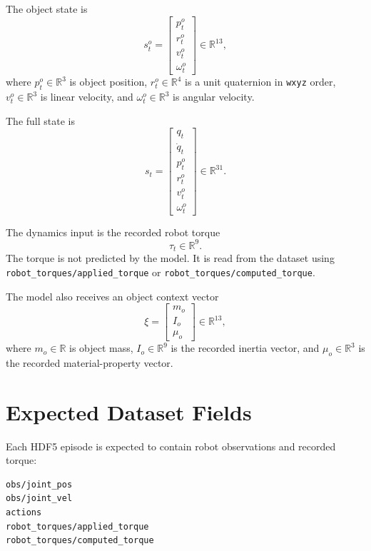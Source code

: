 \documentclass[11pt]{article}
\begin{document}
The object state is
\begin{equation}
  s^o_t =
  \begin{bmatrix}
    p^o_t \\
    r^o_t \\
    v^o_t \\
    \omega^o_t
  \end{bmatrix}
  \in \mathbb{R}^{13},
\end{equation}
where \(p^o_t \in \mathbb{R}^3\) is object position,
\(r^o_t \in \mathbb{R}^4\) is a unit quaternion in \texttt{wxyz} order,
\(v^o_t \in \mathbb{R}^3\) is linear velocity, and
\(\omega^o_t \in \mathbb{R}^3\) is angular velocity.

The full state is
\begin{equation}
  s_t =
  \begin{bmatrix}
    q_t \\
    \dot{q}_t \\
    p^o_t \\
    r^o_t \\
    v^o_t \\
    \omega^o_t
  \end{bmatrix}
  \in \mathbb{R}^{31}.
\end{equation}

The dynamics input is the recorded robot torque
\begin{equation}
  \tau_t \in \mathbb{R}^{9}.
\end{equation}
The torque is not predicted by the model. It is read from the dataset using
\texttt{robot\_torques/applied\_torque} or
\texttt{robot\_torques/computed\_torque}.

The model also receives an object context vector
\begin{equation}
  \xi =
  \begin{bmatrix}
    m_o \\
    I_o \\
    \mu_o
  \end{bmatrix}
  \in \mathbb{R}^{13},
\end{equation}
where \(m_o \in \mathbb{R}\) is object mass,
\(I_o \in \mathbb{R}^9\) is the recorded inertia vector, and
\(\mu_o \in \mathbb{R}^3\) is the recorded material-property vector.

\section{Expected Dataset Fields}

Each HDF5 episode is expected to contain robot observations and recorded torque:
\begin{lstlisting}
obs/joint_pos
obs/joint_vel
actions
robot_torques/applied_torque
robot_torques/computed_torque
\end{lstlisting}
\end{document}
